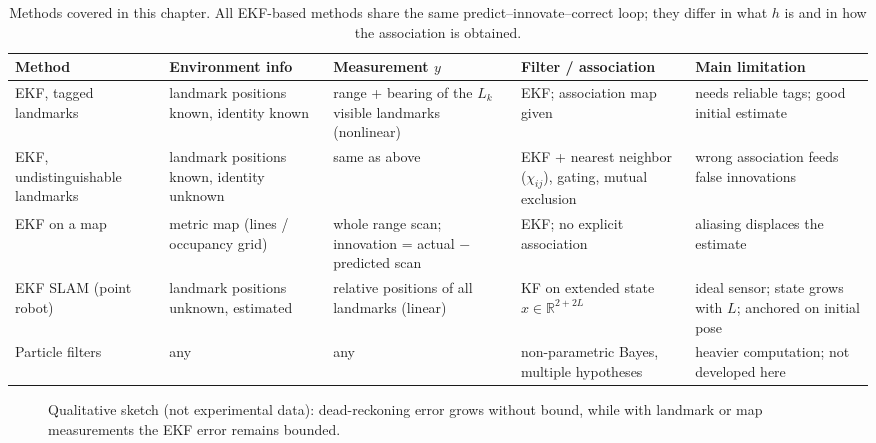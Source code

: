 \documentclass[11pt,a4paper]{article}
\def\bm#1{#1}%
\newcommand{\R}{\mathbb{R}}
\theoremstyle{definition}
\theoremstyle{plain}
\theoremstyle{remark}
\begin{document}
\begin{table}[ht]
\centering
\small
\renewcommand{\arraystretch}{1.25}
\begin{tabularx}{\linewidth}{@{}>{\raggedright\arraybackslash}p{2.4cm}YYYY@{}}
\toprule
\textbf{Method} & \textbf{Environment info} & \textbf{Measurement $\bm y$} & \textbf{Filter / association} & \textbf{Main limitation}\\
\midrule
EKF, tagged landmarks & landmark positions known, identity known & range + bearing of the $L_k$ visible landmarks (nonlinear) & EKF; association map given & needs reliable tags; good initial estimate\\
EKF, undistinguishable landmarks & landmark positions known, identity unknown & same as above & EKF + nearest neighbor ($\chi_{ij}$), gating, mutual exclusion & wrong association feeds false innovations\\
EKF on a map & metric map (lines / occupancy grid) & whole range scan; innovation = actual $-$ predicted scan & EKF; no explicit association & aliasing displaces the estimate\\
EKF SLAM (point robot) & landmark positions unknown, estimated & relative positions of all landmarks (linear) & KF on extended state $\bm x\in\R^{2+2L}$ & ideal sensor; state grows with $L$; anchored on initial pose\\
Particle filters & any & any & non-parametric Bayes, multiple hypotheses & heavier computation; not developed here\\
\bottomrule
\end{tabularx}
\caption{Methods covered in this chapter. All EKF-based methods share the same predict--innovate--correct loop; they differ in what $\bm h$ is and in how the association is obtained.}
\end{table}

\begin{figure}[H]
\centering
{}
\caption{Qualitative sketch (not experimental data): dead-reckoning error grows without bound, while with landmark or map measurements the EKF error remains bounded.}
\label{fig:errors}
\end{figure}
\end{document}
